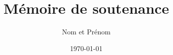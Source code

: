 \documentclass[12pt,a4paper]{ifri}
\begin{document}


\title{Mémoire de soutenance}
\author{Nom et Prénom}

\date{\today}
\maketitle





\tableofcontents
\listoffigures
\listoftables











\end{document}
